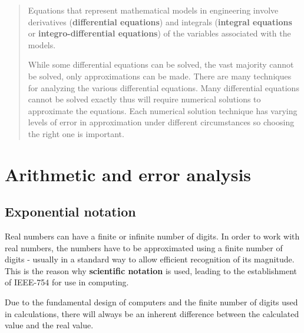 \documentclass[10pt,a4paper]{article}
\begin{document}
\begin{abstract}
    Equations that represent mathematical models in engineering involve derivatives (\textbf{differential
    equations}) and integrals (\textbf{integral equations} or \textbf{integro-differential
    equations}) of the variables associated with the models.\par 
    
    While some differential equations can be solved, the vast majority cannot be solved, only
    approximations can be made. There are many techniques for analyzing the various differential 
    equations. Many differential equations cannot be solved exactly thus will require numerical 
    solutions to approximate the equations. Each numerical solution technique has varying levels of 
    error in approximation under different circumstances so choosing the right one is important.
\end{abstract}


\tableofcontents
\pagebreak
\lstlistoflistings
\pagebreak

\section{Arithmetic and error analysis}
\subsection{Exponential notation}

Real numbers can have a finite or infinite number of digits. In order to work with real numbers, the
numbers have to be approximated using a finite number of digits - usually in a standard way to allow
efficient recognition of its magnitude. This is the reason why \textbf{scientific notation} is used,
leading to the establishment of IEEE-754 for use in computing.

Due to the fundamental design of computers and the finite number of digits used in calculations,
there will always be an inherent difference between the calculated value and the real value.

\end{document}
